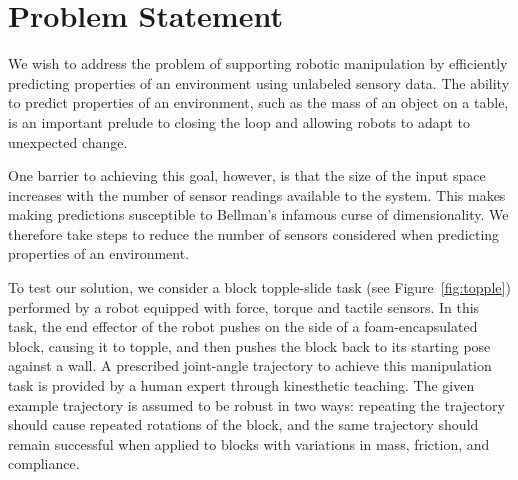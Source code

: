 

\section{Problem Statement}

We wish to address the problem of supporting robotic manipulation by efficiently predicting properties of an environment using unlabeled sensory data.
The ability to predict properties of an environment, such as the mass of an object on a table, is an important prelude to closing the loop and allowing robots to adapt to unexpected change.

One barrier to achieving this goal, however, is that the size of the input space increases with the number of sensor readings available to the system.
This makes making predictions susceptible to Bellman's infamous curse of dimensionality.
We therefore take steps to reduce the number of sensors considered when predicting properties of an environment.

To test our solution, we consider a block topple-slide task (see Figure~\ref{fig:topple}) performed by a robot equipped with force, torque and tactile sensors.
In this task, the end effector of the robot pushes on the side of a foam-encapsulated block, causing it to topple, and then pushes the block back to its starting pose against a wall.
A prescribed joint-angle trajectory to achieve this manipulation task is provided by a human expert through kinesthetic teaching.
The given example trajectory is assumed to be robust in two ways: repeating the trajectory should cause repeated rotations of the block, and the same trajectory should remain successful when applied to blocks with variations in mass, friction, and compliance. 


